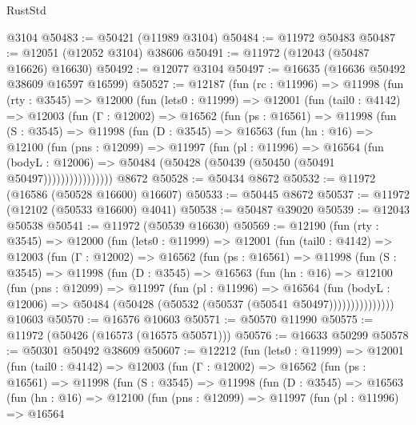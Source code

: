 \begin{lexlean}{RustStd}
\begin{coremodule}
    @3104
@50483 := @50421 (@11989 @3104)
@50484 := @11972 @50483
@50487 := @12051 (@12052 @3104) @38606
@50491 := @11972 (@12043 (@50487 @16626) @16630)
@50492 := @12077 @3104
@50497 := @16635 (@16636 @50492 @38609 @16597 @16599)
@50527 := @12187
    (fun (rc : @11996) =>
    @11998
      (fun (rty : @3545) =>
      @12000
        (fun (lets0 : @11999) =>
        @12001
          (fun (tail0 : @4142) =>
          @12003
            (fun (Γ : @12002) =>
            @16562
              (fun (ps : @16561) =>
              @11998
                (fun (S : @3545) =>
                @11998
                  (fun (D : @3545) =>
                  @16563
                    (fun (hn : @16) =>
                    @12100
                      (fun (pns : @12099) =>
                      @11997
                        (fun (pl : @11996) =>
                        @16564
                          (fun (bodyL : @12006) =>
                          @50484 (@50428 (@50439 (@50450 (@50491 @50497))))))))))))))))
    @8672
@50528 := @50434 @8672
@50532 := @11972 (@16586 (@50528 @16600) @16607)
@50533 := @50445 @8672
@50537 := @11972 (@12102 (@50533 @16600) @4041)
@50538 := @50487 @39020
@50539 := @12043 @50538
@50541 := @11972 (@50539 @16630)
@50569 := @12190
    (fun (rty : @3545) =>
    @12000
      (fun (lets0 : @11999) =>
      @12001
        (fun (tail0 : @4142) =>
        @12003
          (fun (Γ : @12002) =>
          @16562
            (fun (ps : @16561) =>
            @11998
              (fun (S : @3545) =>
              @11998
                (fun (D : @3545) =>
                @16563
                  (fun (hn : @16) =>
                  @12100
                    (fun (pns : @12099) =>
                    @11997
                      (fun (pl : @11996) =>
                      @16564
                        (fun (bodyL : @12006) =>
                        @50484 (@50428 (@50532 (@50537 (@50541 @50497)))))))))))))))
    @10603
@50570 := @16576 @10603
@50571 := @50570 @11990
@50575 := @11972 (@50426 (@16573 (@16575 @50571)))
@50576 := @16633 @50299
@50578 := @50301 @50492 @38609
@50607 := @12212
    (fun (lets0 : @11999) =>
    @12001
      (fun (tail0 : @4142) =>
      @12003
        (fun (Γ : @12002) =>
        @16562
          (fun (ps : @16561) =>
          @11998
            (fun (S : @3545) =>
            @11998
              (fun (D : @3545) =>
              @16563
                (fun (hn : @16) =>
                @12100
                  (fun (pns : @12099) =>
                  @11997
                    (fun (pl : @11996) =>
                    @16564

\end{coremodule}
\end{lexlean}

